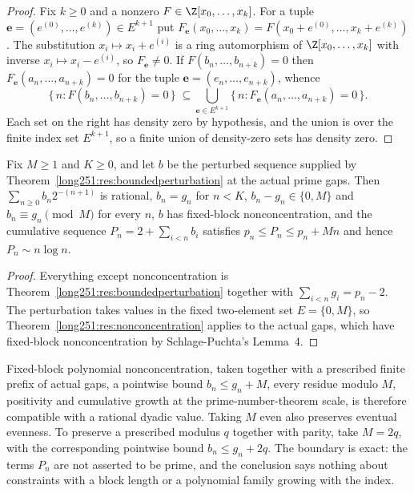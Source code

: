 \documentclass[11pt]{article}
\begin{document}
\begin{proof}
Fix $k\ge0$ and a nonzero $F\in\Z[x_0,\ldots,x_k]$.  For a tuple
$\mathbf e=(e^{(0)},\ldots,e^{(k)})\in E^{k+1}$ put
$F_{\mathbf e}(x_0,\ldots,x_k)=F(x_0+e^{(0)},\ldots,x_k+e^{(k)})$.  The
substitution $x_i\mapsto x_i+e^{(i)}$ is a ring automorphism of
$\Z[x_0,\ldots,x_k]$ with inverse $x_i\mapsto x_i-e^{(i)}$, so
$F_{\mathbf e}\ne0$.  If $F(b_n,\ldots,b_{n+k})=0$ then
$F_{\mathbf e}(a_n,\ldots,a_{n+k})=0$ for the tuple
$\mathbf e=(e_n,\ldots,e_{n+k})$, whence
\[
 \{\,n:F(b_n,\ldots,b_{n+k})=0\,\}
 \;\subseteq\!\!
 \bigcup_{\mathbf e\in E^{k+1}}\!\!
 \{\,n:F_{\mathbf e}(a_n,\ldots,a_{n+k})=0\,\}.
\]
Each set on the right has density zero by hypothesis, and the union is over
the finite index set $E^{k+1}$, so a finite union of density-zero sets has
density zero.
\end{proof}

\begin{corollary}\label{long251:res:nonconc-primes}
Fix $M\ge1$ and $K\ge0$, and let $b$ be the perturbed sequence supplied by
Theorem~\ref{long251:res:boundedperturbation} at the actual prime gaps.  Then
$\sum_{n\ge0}b_n2^{-(n+1)}$ is rational, $b_n=g_n$ for $n<K$,
$b_n-g_n\in\{0,M\}$ and $b_n\equiv g_n\pmod M$ for every $n$, $b$ has
fixed-block nonconcentration, and the cumulative sequence
$P_n=2+\sum_{i<n}b_i$ satisfies $p_n\le P_n\le p_n+Mn$ and hence
$P_n\sim n\log n$.
\end{corollary}

\begin{proof}
Everything except nonconcentration is Theorem~\ref{long251:res:boundedperturbation}
together with $\sum_{i<n}g_i=p_n-2$.  The perturbation takes values in the
fixed two-element set $E=\{0,M\}$, so Theorem~\ref{long251:res:nonconcentration}
applies to the actual gaps, which have fixed-block nonconcentration by
Schlage-Puchta's Lemma~4.
\end{proof}

Fixed-block polynomial nonconcentration, taken together with a prescribed
finite prefix of actual gaps, a pointwise bound $b_n\le g_n+M$, every residue
modulo $M$, positivity and cumulative growth at the prime-number-theorem scale,
is therefore compatible with a rational dyadic value.  Taking $M$ even also
preserves eventual evenness.  To preserve a prescribed modulus $q$ together
with parity, take $M=2q$, with the corresponding pointwise bound
$b_n\le g_n+2q$.  The boundary is exact: the terms $P_n$ are not asserted to be prime,
and the conclusion says nothing about constraints with a block length or a
polynomial family growing with the index.
\end{document}
